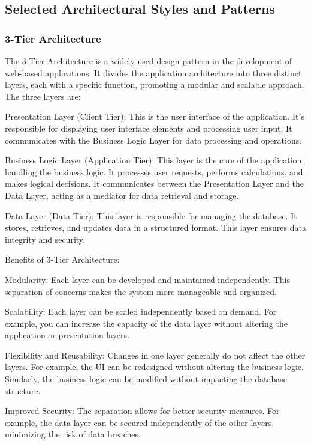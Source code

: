 \subsection{Selected Architectural Styles and Patterns}
\subsubsection{3-Tier Architecture}
The 3-Tier Architecture is a widely-used design pattern in the development of web-based applications. It divides the application architecture into three distinct layers, each with a specific function, promoting a modular and scalable approach. The three layers are:

Presentation Layer (Client Tier): This is the user interface of the application. It's responsible for displaying user interface elements and processing user input. It communicates with the Business Logic Layer for data processing and operations.

Business Logic Layer (Application Tier): This layer is the core of the application, handling the business logic. It processes user requests, performs calculations, and makes logical decisions. It communicates between the Presentation Layer and the Data Layer, acting as a mediator for data retrieval and storage.

Data Layer (Data Tier): This layer is responsible for managing the database. It stores, retrieves, and updates data in a structured format. This layer ensures data integrity and security.

Benefits of 3-Tier Architecture:

Modularity: Each layer can be developed and maintained independently. This separation of concerns makes the system more manageable and organized.

Scalability: Each layer can be scaled independently based on demand. For example, you can increase the capacity of the data layer without altering the application or presentation layers.

Flexibility and Reusability: Changes in one layer generally do not affect the other layers. For example, the UI can be redesigned without altering the business logic. Similarly, the business logic can be modified without impacting the database structure.

Improved Security: The separation allows for better security measures. For example, the data layer can be secured independently of the other layers, minimizing the risk of data breaches.

